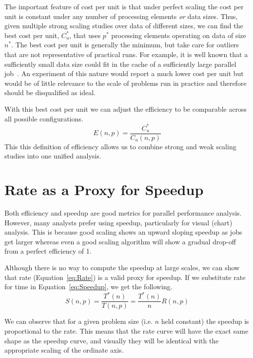 \documentclass{llncs}
\newcommand*{\lcite}[1]{~\cite{#1}}
\begin{document}
The important feature of cost per unit is that under perfect scaling the
cost per unit is constant under any number of processing elements \emph{or}
data sizes. Thus, given multiple strong scaling studies over data of
different sizes, we can find the best cost per unit, $C_u^*$, that uses
$p^*$ processing elements operating on data of size $n^*$. The best cost
per unit is generally the minimum, but take care for outliers that are not
representative of practical runs. For example, it is well known that a
sufficiently small data size could fit in the cache of a sufficiently large
parallel job\lcite{Gustafson1990}. An experiment of this nature would
report a much lower cost per unit but would be of little relevance to the
scale of problems run in practice and therefore should be disqualified as
ideal.

With this best
cost per unit we can adjust the efficiency to be comparable across all
possible configurations.
\begin{equation}
  E(n,p) = \frac{C_u^*}{C_u(n,p)}
  \label{eq:EfficiencyCostPerUnit}
\end{equation}
This this definition of efficiency allows us to combine strong and weak
scaling studies into one unified analysis.

\section{Rate as a Proxy for Speedup}
\label{sec:RateProxy}

\noindent
Both efficiency and speedup are good metrics for parallel performance
analysis. However, many analysts prefer using speedup, particularly for
visual (chart) analysis. This is because good scaling shows an upward
sloping speedup as jobs get larger whereas even a good scaling algorithm
will show a gradual drop-off from a perfect efficiency of 1.

Although there is no way to compute the speedup at large scales, we can
show that rate (Equation~\ref{eq:Rate}) is a valid proxy for speedup. If we
substitute rate for time in Equation~\ref{eq:Speedup}, we get the
following.
\begin{equation}
  S(n,p) = \frac{T^*(n)}{T(n,p)} = \frac{T^*(n)}{n} R(n,p)
  \label{eq:SpeedupFromRate}
\end{equation}

We can observe that for a given problem size (i.e. $n$ held constant) the
speedup is proportional to the rate. This means that the rate curve will
have the exact same shape as the speedup curve, and visually they will be
identical with the appropriate scaling of the ordinate axis.
\end{document}
